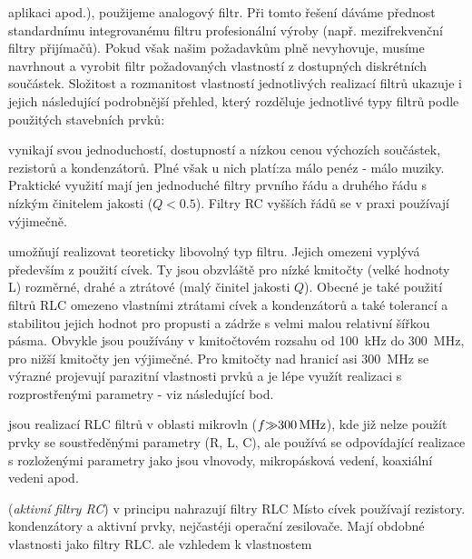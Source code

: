       aplikaci apod.), použijeme analogový filtr. Při tomto řešení dáváme přednost standardnímu
      integrovanému filtru profesionální výroby (např. mezifrekvenční filtry přijímačů). Pokud
      však našim požadavkům plně nevyhovuje, musíme navrhnout a vyrobit filtr požadovaných
      vlastností z dostupných diskrétních součástek. Složitost a rozmanitost vlastností
      jednotlivých realizací filtrů ukazuje i jejich následující podrobnější přehled, který
      rozděluje jednotlivé typy filtrů podle použitých stavebních prvků:
      \begin{description}[noitemsep]
        \item[\textbf{Filtry RC}] vynikají svou jednoduchostí, dostupností a nízkou cenou výchozích
              součástek, rezistorů a kondenzátorů. Plné však u nich platí:za málo penéz - málo
              muziky. Praktické využití mají jen jednoduché filtry prvního řádu a druhého řádu s
              nízkým činitelem jakosti (\(Q < \num{0.5}\)). Filtry RC vyšších řádů se v praxi
              používají výjimečně.
        \item[\textbf{Filtry RLC}] umožňují realizovat teoreticky libovolný typ filtru. Jejich
              omezeni vyplývá především z použití cívek. Ty jsou obzvláště pro nízké kmitočty
              (velké hodnoty L) rozměrné, drahé a ztrátové (malý činitel jakosti \(Q\)). Obecné je
              také použití filtrů RLC omezeno vlastními ztrátami cívek a kondenzátorů a také
              tolerancí a stabilitou jejich hodnot pro propusti a zádrže s velmi malou relativní
              šířkou pásma. Obvykle jsou používány v kmitočtovém rozsahu od \SI{100}{\kilo\hertz}
              do \SI{300}{\mega\hertz}, pro nižší kmitočty jen výjimečné. Pro kmitočty nad
              hranicí asi \SI{300}{\mega\hertz} se výrazné projevují parazitní vlastnosti prvků a
              je lépe využít realizaci s rozprostřenými parametry - viz následující bod.
        \item[\textbf{Mikrovlnné filtry}] jsou realizací RLC filtrů v oblasti mikrovln (\(f
              \SI{>>300}{\mega\hertz}\)), kde již nelze použít prvky se soustředěnými parametry
              (R, L, C), ale používá se odpovídající realizace s rozloženými parametry jako jsou
              vlnovody, mikropásková vedení, koaxiální vedeni apod.
        \item[\textbf{Filtry ARC}] (\emph{aktivní filtry RC}) v principu nahrazují filtry RLC
              Místo cívek používají rezistory. kondenzátory a aktivní prvky, nejčastéji operační
              zesilovače. Mají obdobné vlastnosti jako filtry RLC. ale vzhledem k vlastnostem

\end{description}
